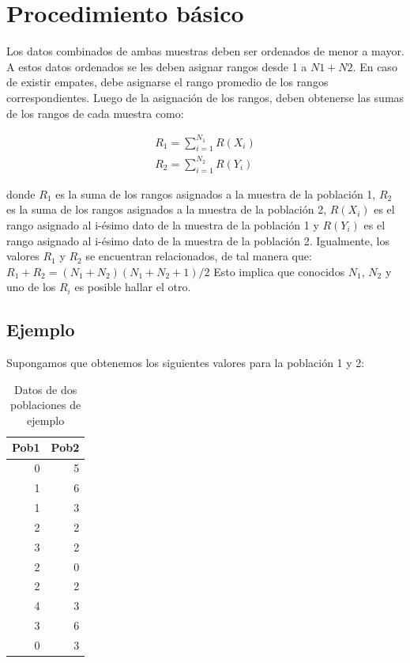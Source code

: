 \documentclass[]{book}
\theoremstyle{definition}
\theoremstyle{definition}
\theoremstyle{definition}
\theoremstyle{remark}
\begin{document}
\hypertarget{np-algoritmo}{%
\section{Procedimiento básico}\label{np-algoritmo}}

Los datos combinados de ambas muestras deben ser ordenados de menor a
mayor. A estos datos ordenados se les deben asignar rangos desde 1 a
\(N1+N2\). En caso de existir empates, debe asignarse el rango promedio
de los rangos correspondientes. Luego de la asignación de los rangos,
deben obtenerse las sumas de los rangos de cada muestra como:

\[
\begin{matrix}
R_1=\sum_{i=1}^{N_1}R(X_i)\\
R_2=\sum_{i=1}^{N_2}R(Y_i)
\end{matrix}
\]

donde \(R_1\) es la suma de los rangos asignados a la muestra de la
población 1, \(R_2\) es la suma de los rangos asignados a la muestra de
la población 2, \(R(X_i)\) es el rango asignado al i-ésimo dato de la
muestra de la población 1 y \(R(Y_i)\) es el rango asignado al i-ésimo
dato de la muestra de la población 2. Igualmente, los valores \(R_1\) y
\(R_2\) se encuentran relacionados, de tal manera que:
\(R_1+R_2=(N_1+N_2)(N_1+N_2+1)/2\) Esto implica que conocidos \(N_1\),
\(N_2\) y uno de los \(R_i\) es posible hallar el otro.

\hypertarget{ejemplo}{%
\subsection{Ejemplo}\label{ejemplo}}

Supongamos que obtenemos los siguientes valores para la población 1 y 2:

\begin{table}

\caption{\label{tab:ejemplo-ranking}Datos de dos poblaciones de ejemplo}
\centering
\begin{tabular}[t]{r|r}
\hline
Pob1 & Pob2\\
\hline
0 & 5\\
\hline
1 & 6\\
\hline
1 & 3\\
\hline
2 & 2\\
\hline
3 & 2\\
\hline
2 & 0\\
\hline
2 & 2\\
\hline
4 & 3\\
\hline
3 & 6\\
\hline
0 & 3\\
\hline
\end{tabular}
\end{table}
\end{document}
